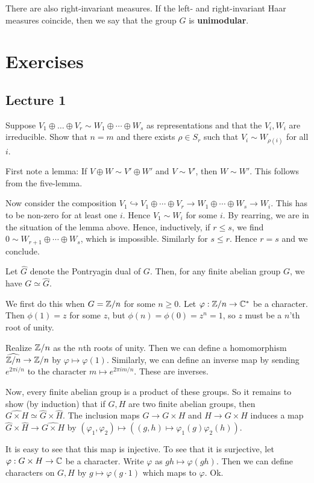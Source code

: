 \documentclass[11pt, english]{article}
\begin{document}
There are also right-invariant measures. If the left- and right-invariant Haar measures coincide, then we say that the group $G$ is \textbf{unimodular}.

\appendix
\section{Exercises}

\subsection{Lecture 1}
\begin{exc}
Suppose $V_1 \oplus \ldots \oplus V_r \sim W_1 \oplus \cdots \oplus W_s$ as representations and that the $V_i,W_i$ are irreducible. Show that $n=m$ and there exists $\rho \in S_r$ such that $V_i \sim W_{\rho(i)}$ for all $i$.
\end{exc}
\begin{sol}
First note a lemma: If $V \oplus W \sim V' \oplus W'$ and $V \sim V'$, then $W \sim W'$. This follows from the five-lemma.

Now consider the composition $V_1 \hookrightarrow V_1 \oplus \cdots \oplus V_r  \to W_1 \oplus \cdots \oplus W_s \to W_i$. This has to be non-zero for at least one $i$. Hence $V_1 \sim W_i$ for some $i$. By rearring, we are in the situation of the lemma above. Hence, inductively, if $r \leq s$, we find $0 \sim W_{r+1} \oplus \cdots \oplus W_s$, which is impossible. Similarly for $s \leq r$. Hence $r=s$ and we conclude.
\end{sol}

\begin{exc}
 Let $\hat G$ denote the Pontryagin dual of $G$. Then, for any finite abelian group $G$, we have $G \simeq \hat G$.
\end{exc}
\begin{sol}
We first do this when $G= \mathbb{Z}/n$ for some $n \geq 0$. Let $\varphi:\mathbb{Z}/n \to \mathbb{C}^\ast$ be a character. Then $\phi(1)=z$ for some $z$, but $\phi(n)=\phi(0)=z^n=1$, so $z$ must be a $n$'th root of unity.

Realize $\mathbb{Z}/n$ as the $n$th roots of unity. Then we can define a homomorphism $\widehat {\mathbb{Z}/n} \to \mathbb{Z}/n$ by $\varphi \mapsto \varphi(1)$. Similarly, we can define an inverse map by sending $e^{2\pi i/n}$  to the character $m \mapsto e^{2\pi i m /n}$. These are inverses.

Now, every finite abelian group is a product of these groups. So it remains to show (by induction) that if $G,H$ are two finite abelian groups, then $\widehat {G \times H} \simeq \widehat G \times \widehat H$. The inclusion maps $G \to G \times H$ and $H \to G \times H$ induces a map $\widehat G \times \widehat H \to \widehat{G \times H}$ by $(\varphi_1, \varphi_2) \mapsto ((g,h) \mapsto \varphi_1(g)\varphi_2(h))$.

It is easy to see that this map is injective. To see that it is surjective, let $\varphi:G \times H \to \mathbb{C}$ be a character. Write $\varphi$ as $gh \mapsto \varphi(gh)$. Then we can define characters on $G,H$ by $g \mapsto \varphi(g \cdot 1)$ which maps to $\varphi$. Ok.
\end{sol}
\end{document}
